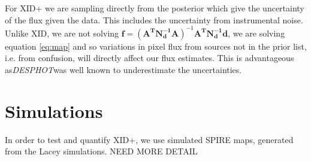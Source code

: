 \documentclass[useAMS,usenatbib]{mnras}
\begin{document}
For XID+ we are sampling directly from the posterior which give the uncertainty of the flux given the data. This includes the uncertainty from instrumental noise. Unlike XID, we are not solving $\mathbf{f}=(\mathbf{A^TN_d^{-1}A})^{-1}\mathbf{A^TN_d^{-1}d}$, we are solving equation \ref{eq:map} and so variations in pixel flux from sources not in the prior list, i.e. from confusion, will directly affect our flux estimates. This is advantageous as\emph{DESPHOT}was well known to underestimate the uncertainties.


\section{Simulations}
In order to test and quantify XID+, we use simulated SPIRE maps, generated from the Lacey simulations. NEED MORE DETAIL
\end{document}

